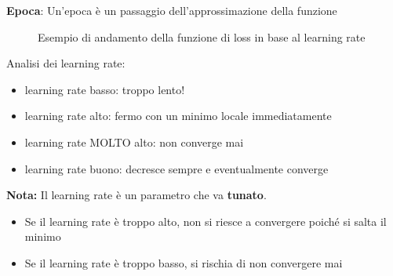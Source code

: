 \textbf{Epoca}: Un'epoca è un passaggio dell'approssimazione della funzione
\begin{figure}[H]
    \begin{center}

    \end{center}
    \caption{Esempio di andamento della funzione di loss in base al learning rate}
\end{figure}

Analisi dei learning rate:
\begin{itemize}
    \item learning rate basso: troppo lento!
    \item learning rate alto: fermo con un minimo locale immediatamente
    \item learning rate MOLTO alto: non converge mai
    \item learning rate buono: decresce sempre e eventualmente converge
\end{itemize}

\textbf{Nota:} Il learning rate è un parametro che va \textbf{tunato}.
\begin{itemize}
    \item Se il learning rate è troppo alto, non si riesce a convergere poiché si salta
          il minimo
    \item Se il learning rate è troppo basso, si rischia di non convergere mai
\end{itemize}

